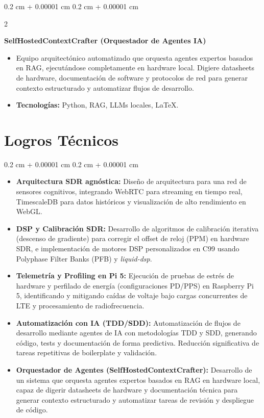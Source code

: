 \documentclass[10pt, letterpaper]{article}
\newenvironment{highlights}{
    \begin{itemize}[
        topsep=0.10 cm,
        parsep=0.10 cm,
        partopsep=0pt,
        itemsep=0pt,
        leftmargin=0.4 cm + 10pt
    ]
}{
    \end{itemize}
} %
\newenvironment{highlightsforbulletentries}{
    \begin{itemize}[
        topsep=0.10 cm,
        parsep=0.10 cm,
        partopsep=0pt,
        itemsep=0pt,
        leftmargin=10pt
    ]
}{
    \end{itemize}
} %
\newenvironment{onecolentry}{
    \begin{adjustwidth}{
        0.2 cm + 0.00001 cm
    }{
        0.2 cm + 0.00001 cm
    }
}{
    \end{adjustwidth}
} %
\newenvironment{twocolentry}[2][]{
    \onecolentry
    \def\secondColumn{#2}
    \setcolumnwidth{\fill, 4.5 cm}
    \begin{paracol}{2}
}{
    \switchcolumn \raggedleft \secondColumn
    \end{paracol}
    \endonecolentry
} %
\let\hrefWithoutArrow\href
\renewcommand{\href}[2]{\hrefWithoutArrow{#1}{\ifthenelse{\equal{#2}{}}{ }{#2 }\raisebox{.15ex}{\footnotesize \faExternalLink*}}}
\begin{document}
        \vspace{0.2 cm}

        \begin{twocolentry}{
            \href{https://github.com/dramirezbe/SelfHostedContextCrafter}{Repo: ContextCrafter}
        }
            \textbf{SelfHostedContextCrafter (Orquestador de Agentes IA)}
            \begin{highlights}
                \item Equipo arquitectónico automatizado que orquesta agentes expertos basados en RAG, ejecutándose completamente en hardware local. Digiere datasheets de hardware, documentación de software y protocolos de red para generar contexto estructurado y automatizar flujos de desarrollo.
                \item \textbf{Tecnologías:} Python, RAG, LLMs locales, LaTeX.
            \end{highlights}
        \end{twocolentry}

    \section{Logros Técnicos}

        \begin{onecolentry}
            \begin{highlightsforbulletentries}
                \item \textbf{Arquitectura SDR agnóstica:} Diseño de arquitectura para una red de sensores cognitivos, integrando WebRTC para streaming en tiempo real, TimescaleDB para datos históricos y visualización de alto rendimiento en WebGL.
                \item \textbf{DSP y Calibración SDR:} Desarrollo de algoritmos de calibración iterativa (descenso de gradiente) para corregir el offset de reloj (PPM) en hardware SDR, e implementación de motores DSP personalizados en C99 usando Polyphase Filter Banks (PFB) y \textit{liquid-dsp}.
                \item \textbf{Telemetría y Profiling en Pi 5:} Ejecución de pruebas de estrés de hardware y perfilado de energía (configuraciones PD/PPS) en Raspberry Pi 5, identificando y mitigando caídas de voltaje bajo cargas concurrentes de LTE y procesamiento de radiofrecuencia.
                \item \textbf{Automatización con IA (TDD/SDD):} Automatización de flujos de desarrollo mediante agentes de IA con metodologías TDD y SDD, generando código, tests y documentación de forma predictiva. Reducción significativa de tareas repetitivas de boilerplate y validación.
                \item \textbf{Orquestador de Agentes (SelfHostedContextCrafter):} Desarrollo de un sistema que orquesta agentes expertos basados en RAG en hardware local, capaz de digerir datasheets de hardware y documentación técnica para generar contexto estructurado y automatizar tareas de revisión y despliegue de código.
            \end{highlightsforbulletentries}
        \end{onecolentry}
\end{document}
